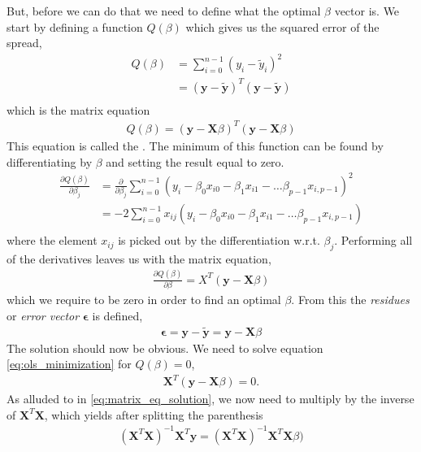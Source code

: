 \documentclass[11pt]{article}
\begin{document}
But, before we can do that we need to define what the optimal $\beta$ vector is. We start by defining a function $Q(\beta)$ which gives us the squared error of the spread,
\begin{align*}
    Q(\beta) &= \sum^{n-1}_{i=0} (y_i - \tilde{y}_i)^2 \\
    &= (\bm{y} - \tilde{\bm{y}})^T (\bm{y} - \tilde{\bm{y}}) \\
\end{align*}
which is the matrix equation
\begin{align}
    Q(\beta) = (\bm{y} - \bm{X}\beta)^T (\bm{y} - \bm{X}\beta)
    \label{eq:ols_minimization_function}
\end{align}
This equation is called the \citep[p. 12]{2018arXiv180308823M}. The minimum of this function can be found by differentiating by $\beta$ and setting the result equal to zero. 
\begin{align*}
    \frac{\partial Q(\beta)}{\partial\beta_j} &= \frac{\partial}{\partial\beta_j}\sum^{n-1}_{i=0} (y_i - \beta_0 x_{i0} - \beta_1 x_{i1} - \dots \beta_{p-1} x_{i,p-1})^2 \\
    &= -2\sum^{n-1}_{i=0} x_{ij}(y_i - \beta_0 x_{i0} - \beta_1 x_{i1} - \dots \beta_{p-1} x_{i,p-1}) \\
\end{align*}
where the element $x_{ij}$ is picked out by the differentiation w.r.t. $\beta_j$. Performing all of the derivatives leaves us with the matrix equation,
\begin{align}
    \frac{\partial Q(\beta)}{\partial\beta} = X^T (\bm{y} - \bm{X}\beta)
    \label{eq:ols_minimization}
\end{align}
which we require to be zero in order to find an optimal $\beta$. From this the \textit{residues} or \textit{error vector} $\bm{\epsilon}$ is defined,
\begin{align}
    \bm{\epsilon} = \bm{y} - \tilde{\bm{y}} = \bm{y} - \bm{X}\beta
    \label{eq:ols_residues}
\end{align}
The solution should now be obvious. We need to solve equation \eqref{eq:ols_minimization} for $Q(\beta)=0$,
\begin{align*}
    \bm{X}^T (\bm{y} - \bm{X}\beta) = 0.
\end{align*}
As alluded to in \eqref{eq:matrix_eq_solution}, we now need to multiply by the inverse of $\bm{X}^T\bm{X}$, which yields after splitting the parenthesis
\begin{align*}
    \left(\bm{X}^T\bm{X}\right)^{-1}\bm{X}^T \bm{y} = \left(\bm{X}^T\bm{X}\right)^{-1}\bm{X}^T\bm{X}\beta)
\end{align*}
\end{document}
